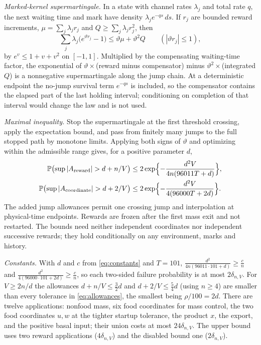 \documentclass[11pt,letterpaper]{article}
\theoremstyle{plain}
\theoremstyle{definition}
\theoremstyle{remark}
\numberwithin{equation}{section}
\newcommand{\PP}{\mathbb P}
\begin{document}
\emph{Marked-kernel supermartingale.} In a state with channel rates $\lambda_j$ and total rate $q$, the next waiting time and mark have density $\lambda_je^{-qs}\,ds$. If $r_j$ are bounded reward increments, $\mu=\sum_j\lambda_jr_j$ and $Q\ge\sum_j\lambda_jr_j^2$, then
\[
 \sum_j\lambda_j\bigl(e^{\vartheta r_j}-1\bigr)\le\vartheta\mu+\vartheta^2Q\qquad(|\vartheta r_j|\le1),
\]
by $e^v\le1+v+v^2$ on $[-1,1]$. Multiplied by the compensating waiting-time factor, the exponential of $\vartheta\times$(reward minus compensator) minus $\vartheta^2\times$(integrated $Q$) is a nonnegative supermartingale along the jump chain. At a deterministic endpoint the no-jump survival term $e^{-qs}$ is included, so the compensator contains the elapsed part of the last holding interval; conditioning on completion of that interval would change the law and is not used.

\emph{Maximal inequality.} Stop the supermartingale at the first threshold crossing, apply the expectation bound, and pass from finitely many jumps to the full stopped path by monotone limits. Applying both signs of $\vartheta$ and optimizing within the admissible range gives, for a positive parameter $d$,
\begin{align*}
 \PP\bigl(\sup|A_{\rm reward}|>d+n/V\bigr)&\le2\exp\Bigl\{-\frac{d^2V}{4n(96011T+d)}\Bigr\},\\
 \PP\bigl(\sup|A_{\rm coordinate}|>d+2/V\bigr)&\le2\exp\Bigl\{-\frac{d^2V}{4(96000T+2d)}\Bigr\}.
\end{align*}
The added jump allowances permit one crossing jump and interpolation at physical-time endpoints. Rewards are frozen after the first mass exit and not restarted. The bounds need neither independent coordinates nor independent successive rewards; they hold conditionally on any environment, marks and history.

\emph{Constants.} With $d$ and $c$ from \eqref{eq:constants} and $T=101$, $\frac{d^2}{4n(96011\cdot101+d)}\ge\frac{c}{n}$ and $\frac{d^2}{4(96000\cdot101+2d)}\ge\frac cn$, so each two-sided failure probability is at most $2\delta_{n,V}$. For $V\ge2n/d$ the allowances $d+n/V\le\frac32d$ and $d+2/V\le\frac54d$ (using $n\ge4$) are smaller than every tolerance in \eqref{eq:allowances}, the smallest being $\rho/100=2d$. There are twelve applications: nonfood mass, six food coordinates for mass control, the two food coordinates $u,w$ at the tighter startup tolerance, the product $x$, the export, and the positive basal input; their union costs at most $24\delta_{n,V}$. The upper bound uses two reward applications ($4\delta_{n,V}$) and the disabled bound one ($2\delta_{n,V}$).
\end{document}
